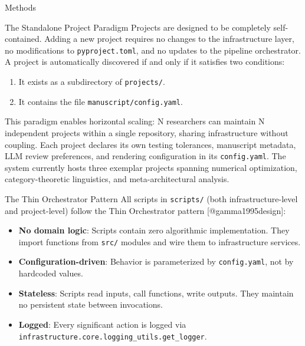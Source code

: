 \documentclass[
  ignorenonframetext,
]{beamer}
\providecommand{\tightlist}{%
  \setlength{\itemsep}{0pt}\setlength{\parskip}{0pt}}
\begin{document}
\begin{frame}[fragile]{Methods}
\begin{block}{The Standalone Project Paradigm}
\protect{}\label{the-standalone-project-paradigm}
Projects are designed to be completely self-contained. Adding a new
project requires no changes to the infrastructure layer, no
modifications to \texttt{pyproject.toml}, and no updates to the pipeline
orchestrator. A project is automatically discovered if and only if it
satisfies two conditions:

\begin{enumerate}
\tightlist
\item
  It exists as a subdirectory of \texttt{projects/}.
\item
  It contains the file \texttt{manuscript/config.yaml}.
\end{enumerate}

This paradigm enables horizontal scaling: N researchers can maintain N
independent projects within a single repository, sharing infrastructure
without coupling. Each project declares its own testing tolerances,
manuscript metadata, LLM review preferences, and rendering configuration
in its \texttt{config.yaml}. The system currently hosts three exemplar
projects spanning numerical optimization, category-theoretic
linguistics, and meta-architectural analysis.
\end{block}

\begin{block}{The Thin Orchestrator Pattern}
\protect{}\label{the-thin-orchestrator-pattern}
All scripts in \texttt{scripts/} (both infrastructure-level and
project-level) follow the Thin Orchestrator pattern
{[}@gamma1995design{]}:

\begin{itemize}
\tightlist
\item
  \textbf{No domain logic}: Scripts contain zero algorithmic
  implementation. They import functions from \texttt{src/} modules and
  wire them to infrastructure services.
\item
  \textbf{Configuration-driven}: Behavior is parameterized by
  \texttt{config.yaml}, not by hardcoded values.
\item
  \textbf{Stateless}: Scripts read inputs, call functions, write
  outputs. They maintain no persistent state between invocations.
\item
  \textbf{Logged}: Every significant action is logged via
  \texttt{infrastructure.core.logging\_utils.get\_logger}.
\end{itemize}


\end{block}
\end{frame}
\end{document}
